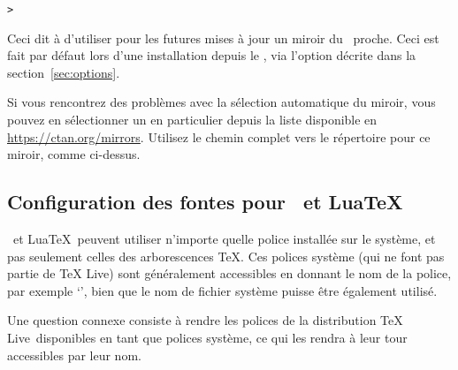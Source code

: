 \documentclass[german, english, french, 12pt]{article}
\renewcommand{\TL}{\TeX{} Live\xspace}%
\begin{document}
\begin{alltt}
> 
\end{alltt}

Ceci dit à  d'utiliser pour les futures mises à jour un miroir du
\CTAN\ proche. Ceci est fait par défaut lors d'une installation depuis le \DVD,
via l'option décrite dans la section~\ref{sec:options}.

Si vous rencontrez des problèmes avec la sélection automatique du miroir, vous
pouvez en sélectionner un en particulier depuis la liste disponible en
\url{https://ctan.org/mirrors}. Utilisez le chemin complet vers le répertoire
 pour ce miroir, comme ci-dessus.


\subsection{Configuration des fontes pour \protect\XeTeX\ et Lua\protect\TeX}
\label{sec:font-conf-sys}

\XeTeX\ et Lua\TeX\ peuvent utiliser n'importe quelle police installée sur le
système, et pas seulement celles des arborescences \TeX. Ces polices système
(qui ne font pas partie de \TL) sont généralement accessibles en donnant le nom
de la police, par exemple `', bien que le nom de fichier
système puisse être également utilisé.

Une question connexe consiste à rendre les polices de la distribution \TL\
disponibles en tant que polices système, ce qui les rendra à leur tour
accessibles par leur nom.
\end{document}
